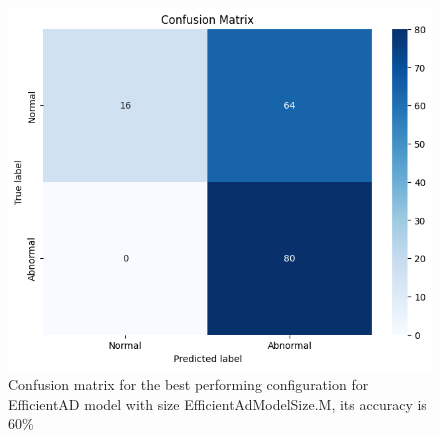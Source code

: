 \begin{figure}[H]
    \centering
    \includegraphics[width=1\linewidth]{Rohit_Master_Thesis//Images/efficientad_confusion_matrix_best.png}
    \caption{Confusion matrix for the best performing configuration for EfficientAD model with size EfficientAdModelSize.M, its accuracy is 60\%}
    \label{fig:efficientad confusion matrix}
\end{figure}









